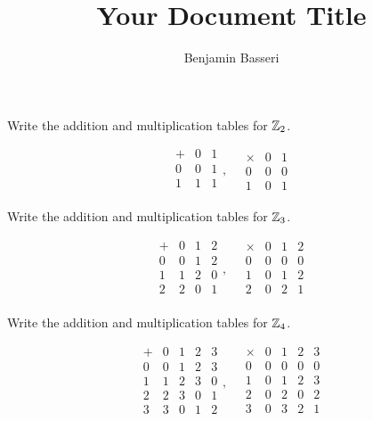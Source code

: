 \documentclass{article}
\title{Your Document Title}
\author{Benjamin Basseri}
\begin{document}
\maketitle

\begin{problem}
Write the addition and multiplication tables for $\mathbb{Z}_2$.
\end{problem}

$$\begin{array}{c|cc}
    + & 0 & 1 \\
    \hline
    0 & 0 & 1 \\
    1 & 1 & 1 \\
  \end{array}, \quad
  \begin{array}{c|cc}
    \times & 0 & 1 \\
    \hline
    0      & 0 & 0 \\
    1      & 0 & 1
  \end{array}$$

\begin{problem}
Write the addition and multiplication tables for $\mathbb{Z}_3$.
\end{problem}

$$\begin{array}{c|ccc}
    + & 0 & 1 & 2 \\
    \hline
    0 & 0 & 1 & 2 \\
    1 & 1 & 2 & 0 \\
    2 & 2 & 0 & 1 \\
  \end{array}, \quad
  \begin{array}{c|ccc}
    \times & 0 & 1 & 2 \\
    \hline
    0      & 0 & 0 & 0 \\
    1      & 0 & 1 & 2 \\
    2      & 0 & 2 & 1 \\
  \end{array}$$

\begin{problem}
Write the addition and multiplication tables for $\mathbb{Z}_4$.
\end{problem}

$$\begin{array}{c|cccc}
    + & 0 & 1 & 2 & 3 \\
    \hline
    0 & 0 & 1 & 2 & 3 \\
    1 & 1 & 2 & 3 & 0 \\
    2 & 2 & 3 & 0 & 1 \\
    3 & 3 & 0 & 1 & 2 \\
  \end{array}, \quad
  \begin{array}{c|cccc}
    \times & 0 & 1 & 2 & 3 \\
    \hline
    0      & 0 & 0 & 0 & 0 \\
    1      & 0 & 1 & 2 & 3 \\
    2      & 0 & 2 & 0 & 2 \\
    3      & 0 & 3 & 2 & 1 \\
  \end{array}$$
\end{document}
